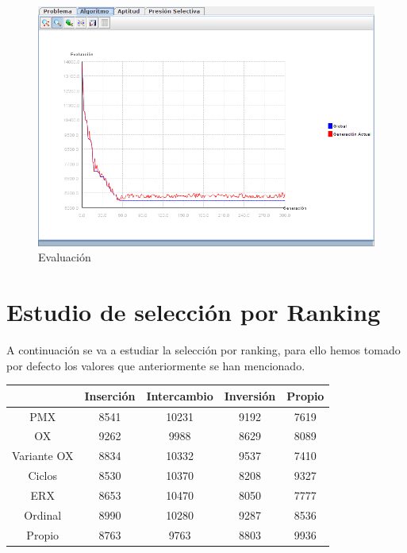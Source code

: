 \documentclass[12pt]{article}
\begin{document}
\begin{figure}[H]
\centering
\includegraphics[scale=0.4]{graficas/fig1graf}
\caption{Evaluación}
\label{fig}
\end{figure} 

\section{Estudio de selección por Ranking}

A continuación se va a estudiar la selección por ranking, para ello hemos tomado por defecto los valores que anteriormente se han mencionado.	

\begin{table}[H]
\begin{center}
\begin{tabular}{|ccccc|} \hline
	   & Inserción & Intercambio & Inversión & Propio \\  \hline
PMX 	   &  8541 & 10231 & 9192 & 7619 \\ 
OX 	   & 9262 & 9988 & 8629 & 8089  \\ 
Variante OX & 8834 & 10332 & 9537 & 7410 \\
Ciclos 	   & 8530 & 10370 & 8208 & 9327 \\
ERX 	   & 8653 & 10470 & 8050 & 7777 \\
Ordinal    & 8990 & 10280 & 9287 & 8536 \\
Propio     & 8763 & 9763 & 8803 & 9936 \\  \hline
\end{tabular}
\end{center}
\end{table}
\end{document}
